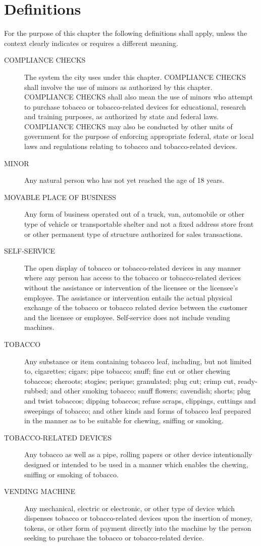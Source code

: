 \section{Definitions}
For the purpose of this chapter the following definitions shall apply, unless the context clearly indicates or requires a different meaning.
\begin{description}
    \item[COMPLIANCE CHECKS] The system the city uses under this chapter. COMPLIANCE CHECKS shall involve the use of minors as authorized by this chapter. COMPLIANCE CHECKS shall also mean the use of minors who attempt to purchase tobacco or tobacco-related devices for educational, research and training purposes, as authorized by state and federal laws. COMPLIANCE CHECKS may also be conducted by other units of government for the purpose of enforcing appropriate federal, state or local laws and regulations relating to tobacco and tobacco-related devices.
    \item[MINOR] Any natural person who has not yet reached the age of 18 years.
    \item[MOVABLE PLACE OF BUSINESS] Any form of business operated out of a truck, van, automobile or other type of vehicle or transportable shelter and not a fixed address store front or other permanent type of structure authorized for sales transactions.
    \item[SELF-SERVICE] The open display of tobacco or tobacco-related devices in any manner where any person has access to the tobacco or tobacco-related devices without the assistance or intervention of the licensee or the licensee’s employee.  The assistance or intervention entails the actual physical exchange of the tobacco or tobacco related device between the customer and the licensee or employee.  Self-service does not include vending machines.
    \item[TOBACCO] Any substance or item containing tobacco leaf, including, but not limited to, cigarettes; cigars; pipe tobacco; snuff; fine cut or other chewing tobaccos; cheroots; stogies; perique; granulated; plug cut; crimp cut, ready-rubbed; and other smoking tobacco; snuff flowers; cavendish; shorts; plug and twist tobaccos; dipping tobaccos; refuse scraps, clippings, cuttings and sweepings of tobacco; and other kinds and forms of tobacco leaf prepared in the manner as to be suitable for chewing, sniffing or smoking.
    \item[TOBACCO-RELATED DEVICES] Any tobacco as well as a pipe, rolling papers or other device intentionally designed or intended to be used in a manner which enables the chewing, sniffing or smoking of tobacco.
    \item[VENDING MACHINE] Any mechanical, electric or electronic, or other type of device which dispenses tobacco or tobacco-related devices upon the insertion of money, tokens, or other form of payment directly into the machine by the person seeking to purchase the tobacco or tobacco-related device.
\end{description}

